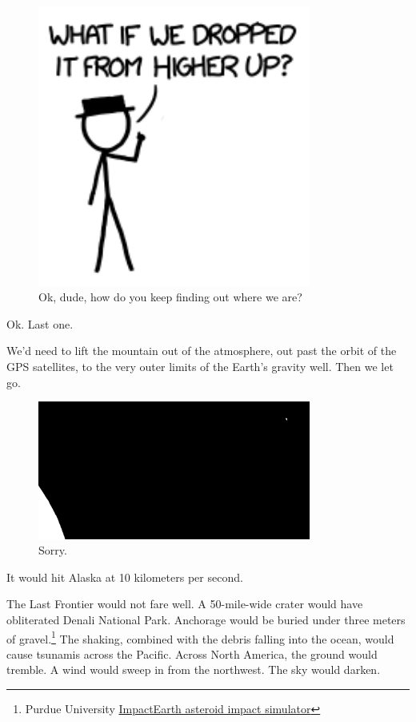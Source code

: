 {\begin{figure}[!htbp]
\centering
\includegraphics[scale=0.5, max width=0.8\textwidth]{imgs/a/57/mountain_hat.png}
\caption{Ok, dude, how do you keep finding out where we are?}
\end{figure}

{Ok. Last one.}

{We'd need to lift the mountain out of the atmosphere, out past the orbit of the GPS satellites, to the very outer limits of the Earth's gravity well. Then we let go.}

\begin{figure}[!htbp]
\centering
\includegraphics[scale=0.5, max width=0.8\textwidth]{imgs/a/57/mountain_space.png}
\caption{Sorry.}
\end{figure}

{It would hit Alaska at 10 kilometers per second.}

{The Last Frontier would not fare well. A 50-mile-wide crater would have obliterated Denali National Park. Anchorage would be buried under three meters of gravel.{\footnote{Purdue University \href{http://www.purdue.edu/impactearth/}{ImpactEarth asteroid impact simulator}} } The shaking, combined with the debris falling into the ocean, would cause tsunamis across the Pacific. Across North America, the ground would tremble. A wind would sweep in from the northwest. The sky would darken.}

}
